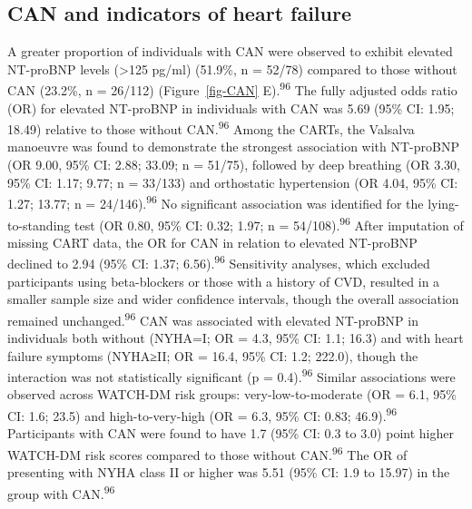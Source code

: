 \documentclass[
  a4paper,
  headsepline=true,
  open=left]{scrbook}
\begin{document}
\restoregeometry

\hypertarget{can-and-indicators-of-heart-failure}{%
\subsection{CAN and indicators of heart
failure}\label{can-and-indicators-of-heart-failure}}

A greater proportion of individuals with CAN were observed to exhibit
elevated NT-proBNP levels (\textgreater125 pg/ml) (51.9\%, n = 52/78)
compared to those without CAN (23.2\%, n = 26/112) (Figure~\ref{fig-CAN}
E).\textsuperscript{96} The fully adjusted odds ratio (OR) for elevated
NT-proBNP in individuals with CAN was 5.69 (95\% CI: 1.95; 18.49)
relative to those without CAN.\textsuperscript{96} Among the CARTs, the
Valsalva manoeuvre was found to demonstrate the strongest association
with NT-proBNP (OR 9.00, 95\% CI: 2.88; 33.09; n = 51/75), followed by
deep breathing (OR 3.30, 95\% CI: 1.17; 9.77; n = 33/133) and
orthostatic hypertension (OR 4.04, 95\% CI: 1.27; 13.77; n =
24/146).\textsuperscript{96} No significant association was identified
for the lying-to-standing test (OR 0.80, 95\% CI: 0.32; 1.97; n =
54/108).\textsuperscript{96} After imputation of missing CART data, the
OR for CAN in relation to elevated NT-proBNP declined to 2.94 (95\% CI:
1.37; 6.56).\textsuperscript{96} Sensitivity analyses, which excluded
participants using beta-blockers or those with a history of CVD,
resulted in a smaller sample size and wider confidence intervals, though
the overall association remained unchanged.\textsuperscript{96} CAN was
associated with elevated NT-proBNP in individuals both without (NYHA=I;
OR = 4.3, 95\% CI: 1.1; 16.3) and with heart failure symptoms (NYHA≥II;
OR = 16.4, 95\% CI: 1.2; 222.0), though the interaction was not
statistically significant (p = 0.4).\textsuperscript{96} Similar
associations were observed across WATCH-DM risk groups:
very-low-to-moderate (OR = 6.1, 95\% CI: 1.6; 23.5) and
high-to-very-high (OR = 6.3, 95\% CI: 0.83; 46.9).\textsuperscript{96}
Participants with CAN were found to have 1.7 (95\% CI: 0.3 to 3.0) point
higher WATCH-DM risk scores compared to those without
CAN.\textsuperscript{96} The OR of presenting with NYHA class II or
higher was 5.51 (95\% CI: 1.9 to 15.97) in the group with
CAN.\textsuperscript{96}

\end{document}
